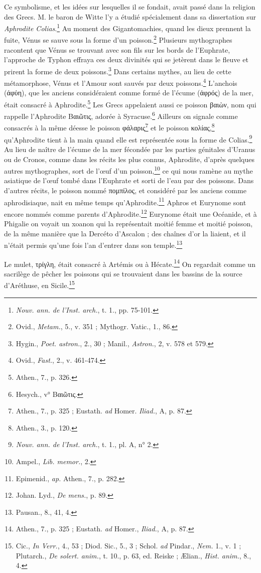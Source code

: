 \documentclass[a4paper, 11pt, oneside]{article}
\begin{document}
Ce symbolisme, et les idées sur lesquelles il se fondait, avait passé dans la religion des Grecs. M. le baron de Witte l'y a étudié spécialement dans sa dissertation sur \emph{Aphrodite Colias}.\footnote{\emph{Nouv. ann. de l'Inst. arch.}, t. 1., pp. 75-101.} Au moment des Gigantomachies, quand les dieux prennent la fuite, Vénus se sauve sous la forme d'un poisson.\footnote{Ovid., \emph{Metam.}, 5., v. 351 ; Mythogr. Vatic., 1., 86.} Plusieurs mythographes racontent que Vénus se trouvant avec son fils sur les bords de l'Euphrate, l'approche de Typhon effraya ces deux divinités qui se jetèrent dans le fleuve et prirent la forme de deux poissons.\footnote{Hygin., \emph{Poet. astron.}, 2., 30 ; Manil., \emph{Astron.}, 2, v. 578 et 579.} Dans certains mythes, au lieu de cette métamorphose, Vénus et l'Amour sont sauvés par deux poissons.\footnote{Ovid., \emph{Fast.}, 2., v. 461-474.} L'anchois (άφὐη), que les anciens considéraient comme formé de l'écume (ἀφρός) de la mer, était consacré à Aphrodite.\footnote{Athen., 7., p. 326.} Les Grecs appelaient aussi ce poisson βαιὼν, nom qui rappelle l'Aphrodite Βαιῶτις, adorée à Syracuse.\footnote{Hesych., v° Βαιῶτις.} Ailleurs on signale comme consacrés à la même déesse le poisson φάλαρις\footnote{Athen., 7., p. 325 ; Eustath. \emph{ad} Homer. \emph{Iliad.}, A, p. 87.} et le poisson κολίας,\footnote{Athen., 3., p. 120.} qu'Aphrodite tient à la main quand elle est représentée sous la forme de Colias.\footnote{\emph{Nouv. ann. de l'Inst. arch.}, t. 1., pl. A, n° 2.} Au lieu de naître de l'écume de la mer fécondée par les parties génitales d'Uranus ou de Cronos, comme dans les récits les plus connus, Aphrodite, d'après quelques autres mythographes, sort de l'œuf d'un poisson,\footnote{Ampel., \emph{Lib. memor.}, 2.} ce qui nous ramène au mythe asiatique de l'œuf tombé dans l'Euphrate et sorti de l'eau par des poissons. Dans d'autres récits, le poisson nommé πομπίλος, et considéré par les anciens comme aphrodisiaque, nait en même temps qu'Aphrodite.\footnote{Epimenid., \emph{ap.} Athen., 7., p. 282.} Aphros et Eurynome sont encore nommés comme parents d'Aphrodite.\footnote{Johan. Lyd., \emph{De mens.}, p. 89.} Eurynome était une Océanide, et à Phigalie on voyait un xoanon qui la représentait moitié femme et moitié poisson, de la même manière que la Dercéto d'Ascalon ; des chaînes d'or la liaient, et il n'était permis qu'une fois l'an d'entrer dans son temple.\footnote{Pausan., 8., 41, 4.}

Le mulet, τρίγλη, était consacré à Artémis ou à Hécate.\footnote{Athen., 7., p. 325 ; Eustath. \emph{ad} Homer., \emph{Iliad.}, A, p. 87.} On regardait comme un sacrilège de pêcher les poissons qui se trouvaient dans les bassins de la source d'Aréthuse, en Sicile.\footnote{Cic., \emph{In Verr.}, 4., 53 ; Diod. Sic., 5., 3 ; Schol. \emph{ad} Pindar., \emph{Nem.} 1., v. 1 ; Plutarch., \emph{De solert. anim.}, t. 10., p. 63, ed. Reiske ; Ælian., \emph{Hist. anim.}, 8., 4.}
\end{document}
